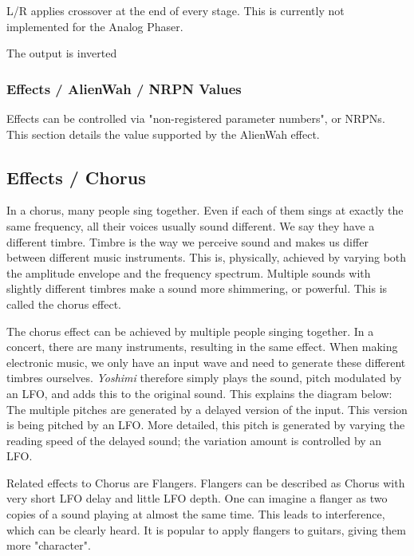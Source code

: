    L/R applies crossover at the end of every stage. This is currently not
   implemented for the Analog Phaser.

   The output is inverted

\subsubsection{Effects / AlienWah / NRPN Values}
\label{subsubsec:effects_edit_alienwah_nrpn}

Effects can be controlled via "non-registered parameter numbers", or NRPNs.
This section details the value supported by the AlienWah effect.

\subsection{Effects / Chorus}
\label{subsec:effects_edit_chorus}

   In a chorus, many people sing together. Even if each of them sings at
   exactly the same frequency, all their voices usually sound different. We
   say they have a different timbre. Timbre is the way we perceive sound and
   makes us differ between different music instruments. This is, physically,
   achieved by varying both the amplitude envelope and the frequency
   spectrum. Multiple sounds with slightly different timbres make a sound
   more shimmering, or powerful. This is called the chorus effect.

   The chorus effect can be achieved by multiple people singing together. In
   a concert, there are many instruments, resulting in the same effect. When
   making electronic music, we only have an input wave and need to generate
   these different timbres ourselves.
   \textsl{Yoshimi} therefore simply plays
   the sound, pitch modulated by an LFO, and adds this to the original sound.
   This explains the diagram below: The multiple pitches are generated by a
   delayed version of the input. This version is being pitched by an LFO.
   More detailed, this pitch is generated by varying the reading speed of
   the delayed sound; the variation amount is controlled by an LFO.

   Related effects to Chorus are Flangers. Flangers can be described as
   Chorus with very short LFO delay and little LFO depth. One can imagine a
   flanger as two copies of a sound playing at almost the same time. This
   leads to interference, which can be clearly heard. It is popular to apply
   flangers to guitars, giving them more "character".

